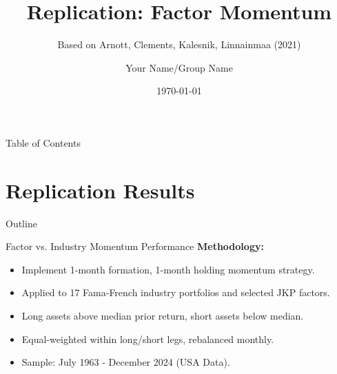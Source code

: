 \documentclass[t]{beamer}\usepackage[]{graphicx}\usepackage[table]{xcolor}
\title{Replication: Factor Momentum}
\subtitle{Based on Arnott, Clements, Kalesnik, Linnainmaa (2021)}
\author{Your Name/Group Name} %
\institute[WU PMP Vienna]{Portfolio Management Program \\ WU Vienna} %
\date{\today} %
\begin{document}
{
\begin{frame}[plain]
    \titlepage %
\end{frame}
}

\begin{frame}{Table of Contents}
    \tableofcontents
\end{frame}



\section{Replication Results}

\begin{frame}{Outline}
\end{frame}

\begin{frame}{Factor vs. Industry Momentum Performance}
\textbf{Methodology:}
\begin{itemize}
    \item Implement 1-month formation, 1-month holding momentum strategy.
    \item Applied to 17 Fama-French industry portfolios and selected JKP factors.
    \item Long assets above median prior return, short assets below median.
    \item Equal-weighted within long/short legs, rebalanced monthly.
    \item Sample: July 1963 - December 2024 (USA Data).
\end{itemize}

\vspace{0.5cm} %

\end{frame}
\end{document}
